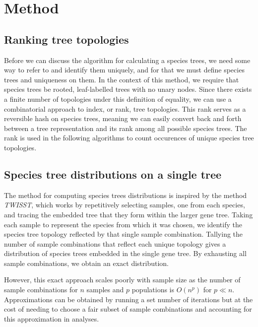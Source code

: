 \documentclass{article}
\newcommand{\twisst}{{\textit{TWISST}}}
\begin{document}
\section{Method}
\subsection{Ranking tree topologies}

Before we can discuss the algorithm for calculating a species trees, we
need some way to refer to and identify them uniquely, and for that we must
define species trees and uniqueness on them. In the context of this method,
we require that species trees be rooted, leaf-labelled trees with no
unary nodes.
Since there exists a finite number of topologies under this definition
of equality, we can use a combinatorial approach to index, or rank,
tree topologies.
This rank serves as a reversible hash on species trees, meaning we can
easily convert back and forth between a tree representation and its
rank among all possible species trees. The rank is used in the following
algorithms to count occurences of unique species tree topologies.

\subsection{Species tree distributions on a single tree}

The method for computing species trees distributions is inspired by the method
\twisst, which works
by repetitively selecting samples, one from each species, and tracing the
embedded tree that they form within the larger gene tree. Taking each
sample to represent the species from which it was chosen, we identify
the species tree topology reflected by that single sample combination.
Tallying the number of sample combinations that
reflect each unique topology gives a distribution of species trees
embedded in the single gene tree. By exhausting all sample combinations,
we obtain an exact distribution.

However, this exact approach scales poorly with sample size as the number
of sample combinations for $n$ samples and $p$ populations is $O(n^p)$ for
$p \ll n$. Approximations can be obtained by running a set number of iterations
but at the cost of needing to choose a fair subset of sample combinations and
accounting for this approximation in analyses.
\end{document}
